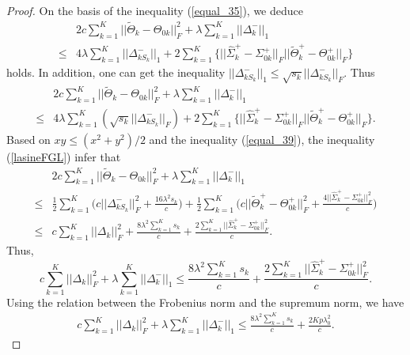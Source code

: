\documentclass[review]{elsarticle}
\newcommand{\1}{{\bf 1}}
\newcommand{\0}{{\bf 0}}
\newtheorem{proof}{Proof}
\begin{document}
\begin{appendices}
\begin{proof}
On the basis of the inequality (\ref{equal_35}), we deduce
\begin{equation}\label{Begin}
\begin{split}
&2c\sum_{k=1}^{K}||\widetilde{\Theta}_k-\Theta_{0k}||_{F}^{2}
+\lambda\sum_{k=1}^{K}||\Delta_{k}^{-}||_1\\
\leq &4\lambda\sum_{k=1}^{K}||\Delta_{kS_k}^{-}||_1
+2\sum_{k=1}^{K}\Big\{||\widehat{\Sigma}_{k}^{+}-\Sigma_{0k}^{+}||_F||\widetilde{\Theta}_k^{+}-\Theta_{0k}^{+}||_{F}\Big\}
\end{split}
\end{equation}
 holds.
 In addition, one can get the inequality $||\Delta_{kS_k}^{-}||_1\leq \sqrt{s_k}||\Delta_{kS_k}^{-}||_{F}$. Thus
\begin{equation}\label{lasineFGL}
\begin{split}
&2c\sum_{k=1}^{K}||\widetilde{\Theta}_k-\Theta_{0k}||_{F}^{2}
+\lambda\sum_{k=1}^{K}||\Delta_{k}^{-}||_1\\
\leq &4\lambda\sum_{k=1}^{K}\left(\sqrt{s_k}||\Delta_{kS_k}^{-}||_{F}\right)
+2\sum_{k=1}^{K}\Big\{||\widehat{\Sigma}_{k}^{+}-\Sigma_{0k}^{+}||_F||\widetilde{\Theta}_k^{+}-\Theta_{0k}^{+}||_{F}\Big\}.
\end{split}
\end{equation}
 Based on $xy\leq (x^2+y^2)/2$ and the inequality (\ref{equal_39}), the inequality (\ref{lasineFGL}) infer that
\begin{equation}
\begin{split}
&2c\sum_{k=1}^{K}||\widetilde{\Theta}_k-\Theta_{0k}||_{F}^{2}
+\lambda\sum_{k=1}^{K}||\Delta_{k}^{-}||_1\\
\leq
&\frac{1}{2}\sum_{k=1}^{K}\Big(c||\Delta_{kS_k}^{-}||_{F}^{2}+\frac{16\lambda^2s_k}{c}\Big)
+\frac{1}{2}\sum_{k=1}^{K}\Big(c||\widetilde{\Theta}_k^{+}-\Theta_{0k}^{+}||_{F}^{2}+
\frac{4||\widehat{\Sigma}_{k}^{+}-\Sigma_{0k}^{+}||_{F}^{2}}{c}\Big)\\
\leq
&c\sum_{k=1}^{K}||\Delta_{k}||_{F}^{2}+\frac{8\lambda^2\sum_{k=1}^{K}s_k}{c}
+\frac{2\sum_{k=1}^{K}||\widehat{\Sigma}_{k}^{+}-\Sigma_{0k}^{+}||_{F}^{2}}{c}.
\end{split}
\end{equation}
Thus,
\begin{equation}\label{equbf40FGL}
c\sum_{k=1}^{K}||\Delta_{k}||_{F}^{2}+\lambda\sum_{k=1}^{K}||\Delta_{k}^{-}||_1
\leq
\frac{8\lambda^2\sum_{k=1}^{K}s_k}{c}
+\frac{2\sum_{k=1}^{K}||\widehat{\Sigma}_{k}^{+}-\Sigma_{0k}^{+}||_{F}^{2}}{c}.
\end{equation}
Using the relation between the Frobenius norm and the supremum norm, we have
\begin{equation}\label{oracleinqua FGL}
\begin{split}
c\sum_{k=1}^{K}||\Delta_{k}||_{F}^{2}+\lambda\sum_{k=1}^{K}||\Delta_{k}^{-}||_1
\leq  \frac{8\lambda^2\sum_{k=1}^{K}s_k}{c}+\frac{2Kp\lambda_0^2}{c}.
\end{split}
\end{equation}


\end{proof}
\end{appendices}
\end{document}
